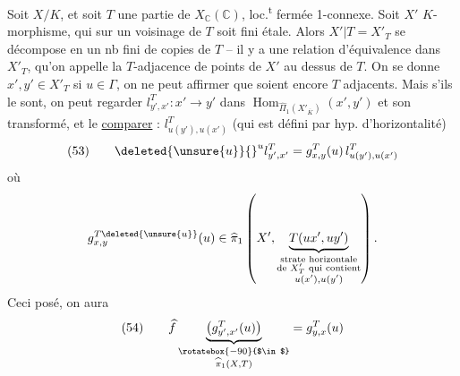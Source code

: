 \hrulefill

Soit $X/K$, et soit $T$ une partie de $X_{\mathbb C}(\mathbb C)$, loc.\textsuperscript{t} fermée 1-connexe. Soit $X'$  $K$-morphisme, qui sur  un voisinage de $T$ soit fini étale. Alors $X'\vert T=X'_T$ se décompose en un nb fini de copies de $T$ -- il y a une relation d'équivalence dans $X'_T$, qu'on appelle la $T$-adjacence de points de $X'$ au dessus de $T$. On se donne  $x',y'\in X'_T$ 
si $u\in\Gamma$, on ne peut affirmer que  soient encore $T$ adjacents.
Mais s'ils le sont, on peut regarder $l^T_{y',x'}:x'\to y'$  dans  $\operatorname{Hom}_{\widehat{\Pi}_1(X'_{\overline K})}(x',y')$ et son transformé,   et le \uline{comparer}  : $l^T_{u(y'),u(x')}$ (qui est défini par hyp. d'horizontalité)
\[
(53)\qquad \deleted{\unsure{u}}{}^u l^T_{y',x'}=g^T_{x,y}(u)\,l^T_{u(y'),u(x')}
\]
où
\[
g^{T\deleted{\unsure{u}}}_{x,y}(u)\in\widehat{\pi}_1\left(X',\underbrace{T(u x',u y')}_{\substack{\text{strate horizontale}\\\text{de }X'_T\text{ qui contient}\\u(x'),u(y')}}\right).
\]
Ceci posé, on aura
\[
(54)\qquad \widehat f\underbrace{\bigl(g^T_{y',x'}(u)\bigr)}_{\substack{\rotatebox{-90}{$\in$}\\\widehat{\pi}_1(X,T)}}=g^T_{y,x}(u)
\]

